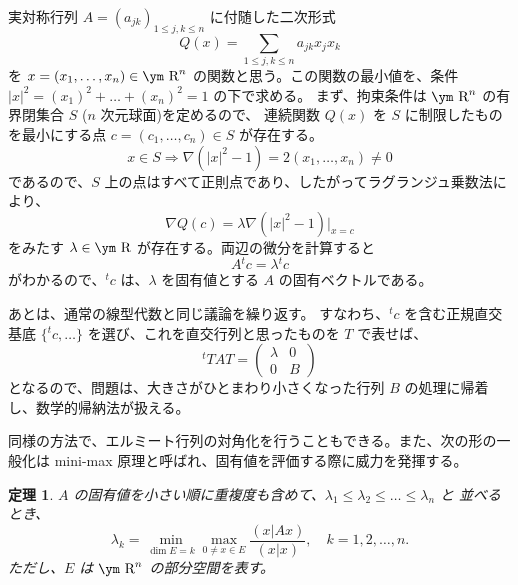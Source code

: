 \documentclass[a4paper]{jsarticle}
\newtheorem{Theorem}{定理}[section]
\theoremstyle{definition}
\theoremstyle{remark}
\newcommand{\R}{\text{\ym R}}
\begin{document}
実対称行列 $A = (a_{jk})_{1 \leq j,k \leq n}$ に付随した二次形式
\[
Q(x) = \sum_{1 \leq j,k \leq n} a_{jk}x_jx_k
\]
を $x = (x_1,\dots, x_n) \in \R^n$ の関数と思う。この関数の最小値を、条件
$|x|^2 = (x_1)^2 + \dots + (x_n)^2 = 1$ の下で求める。
まず、拘束条件は $\R^n$ の有界閉集合 $S$ ($n$ 次元球面)を定めるので、
連続関数 $Q(x)$ を $S$ に制限したものを最小にする点 $c = (c_1,\dots,c_n) \in S$ が存在する。
\[
x \in S \Longrightarrow \nabla(|x|^2 - 1) = 2(x_1,\dots,x_n) \not= 0
\]
であるので、$S$ 上の点はすべて正則点であり、したがってラグランジュ乗数法により、
\[
\nabla Q(c) = \lambda \nabla(|x|^2 - 1)|_{x=c}
\]
をみたす $\lambda \in \R$ が存在する。両辺の微分を計算すると
\[
A {}^tc = \lambda {}^tc
\]
がわかるので、${}^tc$ は、$\lambda$ を固有値とする $A$ の固有ベクトルである。

あとは、通常の線型代数と同じ議論を繰り返す。
すなわち、${}^tc$ を含む正規直交基底 $\{ {}^tc, \dots \}$ を選び、これを直交行列と思ったものを
$T$ で表せば、
\[
{}^tTAT = 
\begin{pmatrix}
\lambda & 0\\
0 & B
\end{pmatrix}
\]
となるので、問題は、大きさがひとまわり小さくなった行列 $B$ の処理に帰着し、数学的帰納法が扱える。

同様の方法で、エルミート行列の対角化を行うこともできる。また、次の形の一般化は
mini-max 原理と呼ばれ、固有値を評価する際に威力を発揮する。

\begin{Theorem}
$A$ の固有値を小さい順に重複度も含めて、$\lambda_1 \leq \lambda_2 \leq \dots \leq \lambda_n$ と
並べるとき、
\[
\lambda_k = \min_{\dim E =k} \max_{0 \not=x \in E} \frac{(x|Ax)}{(x|x)}, 
\quad 
k=1,2,\dots, n. 
\]
ただし、$E$ は $\R^n$ の部分空間を表す。
\end{Theorem}

\end{document}
